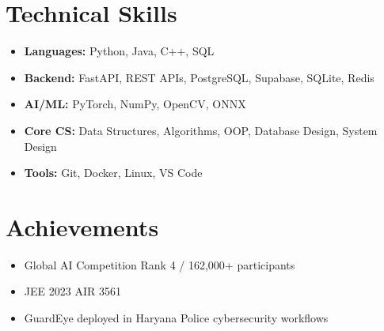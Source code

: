 \documentclass[10pt,a4paper]{article}
\begin{document}
\section{Technical Skills}
\begin{itemize}[leftmargin=0pt, label={}]
    \item \textbf{Languages:} Python, Java, C++, SQL
    \item \textbf{Backend:} FastAPI, REST APIs, PostgreSQL, Supabase, SQLite, Redis
    \item \textbf{AI/ML:} PyTorch, NumPy, OpenCV, ONNX
    \item \textbf{Core CS:} Data Structures, Algorithms, OOP, Database Design, System Design
    \item \textbf{Tools:} Git, Docker, Linux, VS Code
\end{itemize}

\section{Achievements}
\begin{itemize}
    \item Global AI Competition Rank 4 / 162,000+ participants
    \item JEE 2023 AIR 3561
    \item GuardEye deployed in Haryana Police cybersecurity workflows
\end{itemize}
\end{document}

